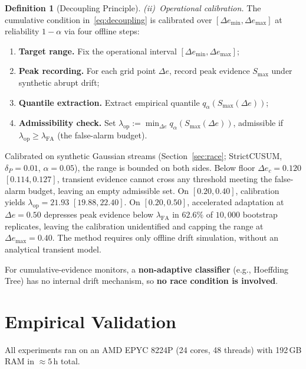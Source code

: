 \documentclass[10pt,conference]{IEEEtran}
\theoremstyle{definition}
\newtheorem{definition}{Definition}
\begin{document}
\begin{definition}[Decoupling Principle]
  \smallskip
  \emph{(ii)~Operational calibration.} The cumulative condition in~\eqref{eq:decoupling} is calibrated over $[\Delta e_{\min}, \Delta e_{\max}]$ at reliability $1-\alpha$ via four offline steps:
  \begin{enumerate}[nosep, leftmargin=*, label=\textbf{(\arabic*)}]
    \item \textbf{Target range.} Fix the operational interval $[\Delta e_{\min}, \Delta e_{\max}]$;
    \item \textbf{Peak recording.} For each grid point $\Delta e$, record peak evidence $S_{\max}$ under synthetic abrupt drift;
    \item \textbf{Quantile extraction.} Extract empirical quantile $q_{\alpha}(S_{\max}(\Delta e))$;
    \item \textbf{Admissibility check.} Set $\lambda_{\mathrm{op}} := \min_{\Delta e} q_{\alpha}(S_{\max}(\Delta e))$, admissible if $\lambda_{\mathrm{op}} \ge \lambda_{\mathrm{FA}}$ (the false-alarm budget).
  \end{enumerate}
  \smallskip
  \noindent Calibrated on synthetic Gaussian streams (Section~\ref{sec:race}; StrictCUSUM, $\delta_P = 0.01$, $\alpha = 0.05$), the range is bounded on both sides. Below floor $\Delta e_c = 0.120$ $[0.114, 0.127]$, transient evidence cannot cross any threshold meeting the false-alarm budget, leaving an empty admissible set. On $[0.20, 0.40]$, calibration yields $\lambda_{\mathrm{op}} = 21.93$ $[19.88, 22.40]$. On $[0.20, 0.50]$, accelerated adaptation at $\Delta e = 0.50$ depresses peak evidence below $\lambda_{\mathrm{FA}}$ in $62.6\%$ of $10{,}000$ bootstrap replicates, leaving the calibration unidentified and capping the range at $\Delta e_{\max} = 0.40$. The method requires only offline drift simulation, without an analytical transient model.
\end{definition}

For cumulative-evidence monitors, a \textbf{non-adaptive classifier} (e.g., Hoeffding Tree) has no internal drift mechanism, so \textbf{no race condition is involved}.

\section{Empirical Validation}\label{sec:experiments}

All experiments ran on an AMD EPYC 8224P (24 cores, 48 threads) with 192\,GB RAM in ${\approx}5$\,h total.
\end{document}
